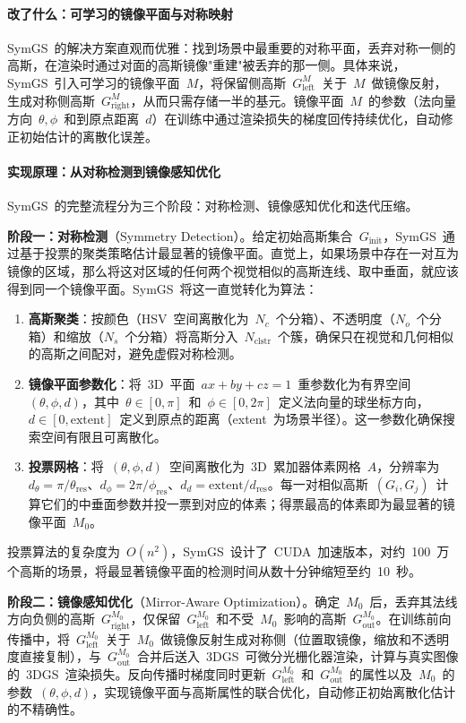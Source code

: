 \paragraph{改了什么：可学习的镜像平面与对称映射}

SymGS~的解决方案直观而优雅：找到场景中最重要的对称平面，丢弃对称一侧的高斯，在渲染时通过对面的高斯镜像"重建"被丢弃的那一侧。具体来说，SymGS~引入可学习的镜像平面~$M$，将保留侧高斯~$G_{\text{left}}^{M}$~关于~$M$~做镜像反射，生成对称侧高斯~$G_{\text{right}}^{M}$，从而只需存储一半的基元。镜像平面~$M$~的参数（法向量方向~$\theta, \phi$~和到原点距离~$d$）在训练中通过渲染损失的梯度回传持续优化，自动修正初始估计的离散化误差。

\paragraph{实现原理：从对称检测到镜像感知优化}

SymGS~的完整流程分为三个阶段：对称检测、镜像感知优化和迭代压缩。

\textbf{阶段一：对称检测}（Symmetry Detection）。给定初始高斯集合~$G_{\text{init}}$，SymGS~通过基于投票的聚类策略估计最显著的镜像平面。直觉上，如果场景中存在一对互为镜像的区域，那么将这对区域的任何两个视觉相似的高斯连线、取中垂面，就应该得到同一个镜像平面。SymGS~将这一直觉转化为算法：
\begin{enumerate}
\item \textbf{高斯聚类}：按颜色（HSV~空间离散化为~$N_c$~个分箱）、不透明度（$N_o$~个分箱）和缩放（$N_s$~个分箱）将高斯分入~$N_{\text{clstr}}$~个簇，确保只在视觉和几何相似的高斯之间配对，避免虚假对称检测。
\item \textbf{镜像平面参数化}：将~3D~平面~$ax + by + cz = 1$~重参数化为有界空间~$(\theta, \phi, d)$，其中~$\theta \in [0, \pi]$~和~$\phi \in [0, 2\pi]$~定义法向量的球坐标方向，$d \in [0, \text{extent}]$~定义到原点的距离（extent~为场景半径）。这一参数化确保搜索空间有限且可离散化。
\item \textbf{投票网格}：将~$(\theta, \phi, d)$~空间离散化为~3D~累加器体素网格~$A$，分辨率为~$d_\theta = \pi / \theta_{\text{res}}$、$d_\phi = 2\pi / \phi_{\text{res}}$、$d_d = \text{extent} / d_{\text{res}}$。每一对相似高斯~$(G_i, G_j)$~计算它们的中垂面参数并投一票到对应的体素；得票最高的体素即为最显著的镜像平面~$M_0$。
\end{enumerate}
投票算法的复杂度为~$O(n^2)$，SymGS~设计了~CUDA~加速版本，对约~100~万个高斯的场景，将最显著镜像平面的检测时间从数十分钟缩短至约~10~秒。

\textbf{阶段二：镜像感知优化}（Mirror-Aware Optimization）。确定~$M_0$~后，丢弃其法线方向负侧的高斯~$G_{\text{right}}^{M_0}$，仅保留~$G_{\text{left}}^{M_0}$~和不受~$M_0$~影响的高斯~$G_{\text{out}}^{M_0}$。在训练前向传播中，将~$G_{\text{left}}^{M_0}$~关于~$M_0$~做镜像反射生成对称侧（位置取镜像，缩放和不透明度直接复制），与~$G_{\text{out}}^{M_0}$~合并后送入~3DGS~可微分光栅化器渲染，计算与真实图像的~3DGS~渲染损失。反向传播时梯度同时更新~$G_{\text{left}}^{M_0}$~和~$G_{\text{out}}^{M_0}$~的属性以及~$M_0$~的参数~$(\theta, \phi, d)$，实现镜像平面与高斯属性的联合优化，自动修正初始离散化估计的不精确性。

